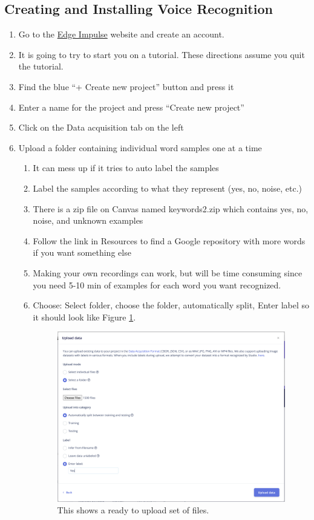 \subsection{Creating and Installing Voice Recognition}
\begin{enumerate}
  \item Go to the \href{https://edgeimpulse.com/}{Edge Impulse} website and create an 
account. 
  \item It is going to try to start you on a tutorial. These directions assume you quit 
      the tutorial.
  \item Find the blue ``+ Create new project'' button and press it 
  \item Enter a name for the project and press ``Create new project''
  \item Click on the Data acquisition tab on the left
  \item Upload a folder containing individual word samples one at a time
  \begin{enumerate}
    \item It can mess up if it tries to auto label the samples
    \item Label the samples according to what they represent (yes, no, noise, etc.)
    \item There is a zip file on Canvas named keywords2.zip which contains yes, no, noise, and unknown examples
    \item Follow the link in Resources to find a Google repository with more words if you want something else
    \item Making your own recordings can work, but will be time consuming since you need 5-10 min of examples 
            for each word you want recognized.
    \item Choose: Select folder, choose the folder, automatically split, Enter label so it should look 
            like Figure \ref{fig:edgeimpulseupload}.

  \begin{figure}[!htb]
    \centering
    \includegraphics[scale=0.3]{machineLearning/upload.png}
    \caption{This shows a ready to upload set of files.}
    \label{fig:edgeimpulseupload}
  \end{figure} 


\end{enumerate}
\end{enumerate}
